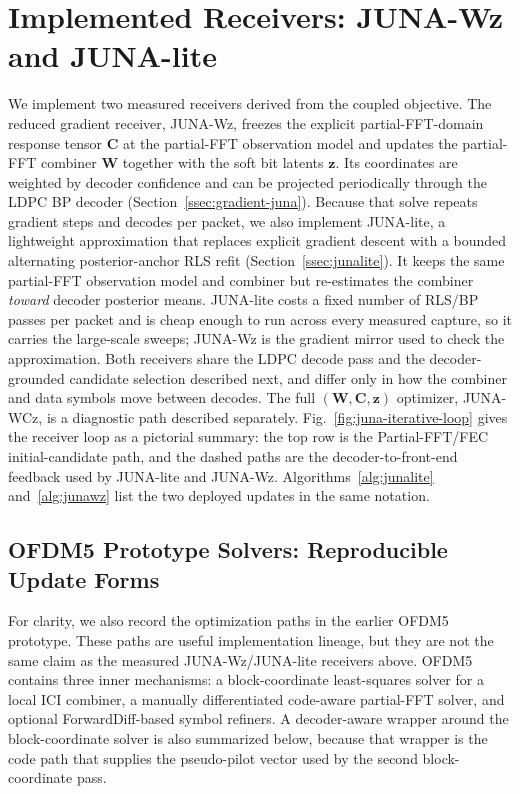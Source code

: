 \documentclass[journal]{IEEEtran}
\newcommand{\junalite}{JUNA-lite}
\newcommand{\junawz}{JUNA-Wz}
\newcommand{\junawcz}{JUNA-WCz}
\begin{document}
\section{Implemented Receivers: \texorpdfstring{\junawz{}}{JUNA-Wz} and
\texorpdfstring{\junalite{}}{JUNA-lite}}\label{sec:solver}
We implement two measured receivers derived from the coupled objective. The
reduced gradient receiver, \junawz{}, freezes the explicit partial-FFT-domain response
tensor $\mathbf C$ at the partial-FFT observation model and updates the
partial-FFT combiner $\mathbf W$ together with the soft bit latents $\mathbf z$.
Its coordinates are weighted by decoder confidence and can be projected
periodically through the LDPC BP decoder (Section~\ref{ssec:gradient-juna}).
Because that solve repeats gradient steps and decodes per packet, we also
implement \junalite{}, a lightweight approximation that replaces explicit
gradient descent with a bounded alternating posterior-anchor RLS refit
(Section~\ref{ssec:junalite}). It keeps the same partial-FFT observation model
and combiner but re-estimates the combiner \emph{toward} decoder posterior means.
\junalite{} costs a fixed number of RLS/BP passes per packet and is cheap enough
to run across every measured capture, so it carries the large-scale sweeps;
\junawz{} is the gradient mirror used to check the approximation. Both receivers
share the LDPC decode pass and the decoder-grounded candidate selection
described next, and differ only in how the combiner and data symbols move
between decodes. The full $(\mathbf W,\mathbf C,\mathbf z)$ optimizer,
\junawcz{}, is a diagnostic path described separately.
Fig.~\ref{fig:juna-iterative-loop} gives the receiver loop as a pictorial
summary: the top row is the Partial-FFT/FEC initial-candidate path, and the dashed paths are
the decoder-to-front-end feedback used by \junalite{} and \junawz{}.
Algorithms~\ref{alg:junalite} and~\ref{alg:junawz} list the two deployed
updates in the same notation.

\subsection{OFDM5 Prototype Solvers: Reproducible Update Forms}
\label{ssec:ofdm5-prototypes}
For clarity, we also record the optimization paths in the earlier OFDM5
prototype. These paths are useful implementation lineage, but they are not the
same claim as the measured \junawz{}/\junalite{} receivers above. OFDM5 contains
three inner mechanisms: a block-coordinate least-squares solver for a local ICI
combiner, a manually differentiated code-aware partial-FFT solver, and optional
ForwardDiff-based symbol refiners. A decoder-aware wrapper around the
block-coordinate solver is also summarized below, because that wrapper is the
code path that supplies the pseudo-pilot vector used by the second
block-coordinate pass.
\end{document}
